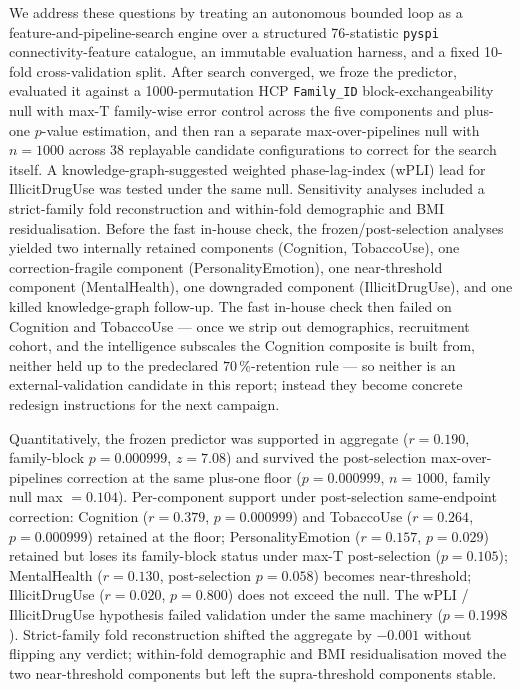 \documentclass[11pt,letterpaper]{report}
\begin{document}
We address these questions by treating an autonomous bounded loop as a feature-and-pipeline-search engine over a structured 76-statistic \texttt{pyspi} connectivity-feature catalogue, an immutable evaluation harness, and a fixed 10-fold cross-validation split. After search converged, we froze the predictor, evaluated it against a 1000-permutation HCP \texttt{Family\_ID} block-exchangeability null with max-T family-wise error control across the five components and plus-one $p$-value estimation, and then ran a separate max-over-pipelines null with $n = 1000$ across 38 replayable candidate configurations to correct for the search itself. A knowledge-graph-suggested weighted phase-lag-index (wPLI) lead for IllicitDrugUse was tested under the same null. Sensitivity analyses included a strict-family fold reconstruction and within-fold demographic and BMI residualisation. Before the fast in-house check, the frozen/post-selection analyses yielded two internally retained components (Cognition, TobaccoUse), one correction-fragile component (PersonalityEmotion), one near-threshold component (MentalHealth), one downgraded component (IllicitDrugUse), and one killed knowledge-graph follow-up. The fast in-house check then failed on Cognition and TobaccoUse --- once we strip out demographics, recruitment cohort, and the intelligence subscales the Cognition composite is built from, neither held up to the predeclared $70\,\%$-retention rule --- so neither is an external-validation candidate in this report; instead they become concrete redesign instructions for the next campaign.

Quantitatively, the frozen predictor was supported in aggregate ($r = 0.190$, family-block $p = 0.000999$, $z = 7.08$) and survived the post-selection max-over-pipelines correction at the same plus-one floor ($p = 0.000999$, $n = 1000$, family null max $= 0.104$). Per-component support under post-selection same-endpoint correction: Cognition ($r = 0.379$, $p = 0.000999$) and TobaccoUse ($r = 0.264$, $p = 0.000999$) retained at the floor; PersonalityEmotion ($r = 0.157$, $p = 0.029$) retained but loses its family-block status under max-T post-selection ($p = 0.105$); MentalHealth ($r = 0.130$, post-selection $p = 0.058$) becomes near-threshold; IllicitDrugUse ($r = 0.020$, $p = 0.800$) does not exceed the null. The wPLI / IllicitDrugUse hypothesis failed validation under the same machinery ($p = 0.1998$). Strict-family fold reconstruction shifted the aggregate by $-0.001$ without flipping any verdict; within-fold demographic and BMI residualisation moved the two near-threshold components but left the supra-threshold components stable.
\end{document}
